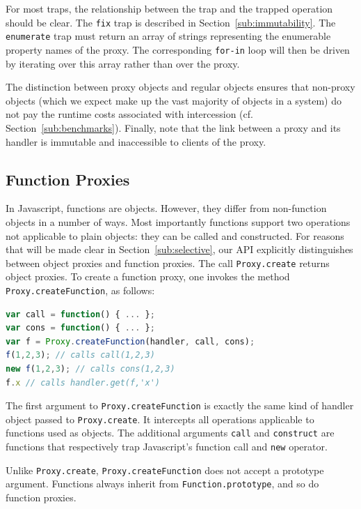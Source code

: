 \documentclass{sig-alternate}
\begin{document}
For most traps, the relationship between the trap and the trapped operation should be clear. The \texttt{fix} trap is described in Section~\ref{sub:immutability}. The \texttt{enumerate} trap must return an array of strings representing the enumerable property names of the proxy. The corresponding \texttt{for-in} loop will then be driven by iterating over this array rather than over the proxy.

The distinction between proxy objects and regular objects ensures that non-proxy objects (which we expect make up the vast majority of objects in a system) do not pay the runtime costs associated with intercession (cf. Section~\ref{sub:benchmarks}). Finally, note that the link between a proxy and its handler is immutable and inaccessible to clients of the proxy.

\subsection{Function Proxies}
\label{sub:funproxies}

In Javascript, functions are objects. However, they differ from non-function objects in a number of ways. Most importantly functions support two operations not applicable to plain objects: they can be called and constructed. For reasons that will be made clear in Section~\ref{sub:selective}, our API explicitly distinguishes between object proxies and function proxies. The call \texttt{Proxy.create} returns object proxies. To create a function proxy, one invokes the method \texttt{Proxy.createFunction}, as follows:

\begin{lstlisting}[language=javascript]
var call = function() { ... };
var cons = function() { ... };
var f = Proxy.createFunction(handler, call, cons);
f(1,2,3); // calls call(1,2,3)
new f(1,2,3); // calls cons(1,2,3)
f.x // calls handler.get(f,'x')
\end{lstlisting}

The first argument to \texttt{Proxy.createFunction} is exactly the same kind of handler object passed to \texttt{Proxy.create}. It intercepts all operations applicable to functions used as objects. The additional arguments \texttt{call} and \texttt{construct} are functions that respectively trap Javascript's function call and \texttt{new} operator.

Unlike \texttt{Proxy.create}, \texttt{Proxy.createFunction} does not accept a prototype argument. Functions always inherit from \texttt{Function.prototype}, and so do function proxies.
\end{document}

